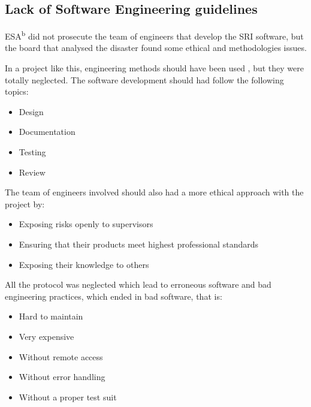 \documentclass[
12pt, %
a4paper, %
oneside, %
headinclude,footinclude, %
BCOR5mm, %
]{scrartcl}
\begin{document}

\subsection{Lack of Software Engineering guidelines}

ESA\textsuperscript{b} did not prosecute the team of engineers that develop the SRI software, but the board that analysed the disaster found some ethical and methodologies issues.

In a project like this, engineering methods should have been used \cite{softwaretechniques:1970}, but they were totally neglected. The software development should had follow the following topics:
\begin{itemize}[noitemsep] %
	\item Design
	\item Documentation
	\item Testing
	\item Review
\end{itemize}

The team of engineers involved should also had a more ethical approach with the project by:

\begin{itemize}[noitemsep] %
	\item Exposing risks openly to supervisors
	\item Ensuring that their products meet highest professional standards
	\item Exposing their knowledge to others
\end{itemize}

All the protocol was neglected which lead to erroneous software and bad engineering practices, which ended in bad software, that is:

\begin{itemize}[noitemsep] %
	\item Hard to maintain
	\item Very expensive
	\item Without remote access
	\item Without error handling
	\item Without a proper test suit
\end{itemize}
\end{document}
